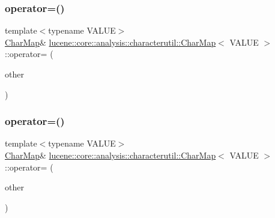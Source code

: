 \mbox{\label{classlucene_1_1core_1_1analysis_1_1characterutil_1_1CharMap_aabcf4f0d534fb6050aeb140d418a0fba}} 
\subsubsection{\texorpdfstring{operator=()}{operator=()}\hspace{0.1cm}{\footnotesize\ttfamily [1/2]}}
{\footnotesize\ttfamily template$<$typename V\+A\+L\+UE$>$ \\
\mbox{\hyperlink{classlucene_1_1core_1_1analysis_1_1characterutil_1_1CharMap}{Char\+Map}}\& \mbox{\hyperlink{classlucene_1_1core_1_1analysis_1_1characterutil_1_1CharMap}{lucene\+::core\+::analysis\+::characterutil\+::\+Char\+Map}}$<$ V\+A\+L\+UE $>$\+::operator= (\begin{DoxyParamCaption}\item[{const \mbox{\hyperlink{classlucene_1_1core_1_1analysis_1_1characterutil_1_1CharMap}{Char\+Map}}$<$ V\+A\+L\+UE $>$ \&}]{other }\end{DoxyParamCaption})\hspace{0.3cm}{\ttfamily [inline]}}

\mbox{\label{classlucene_1_1core_1_1analysis_1_1characterutil_1_1CharMap_adef93a87f617af2b3f949b40ffd82cca}} 
\subsubsection{\texorpdfstring{operator=()}{operator=()}\hspace{0.1cm}{\footnotesize\ttfamily [2/2]}}
{\footnotesize\ttfamily template$<$typename V\+A\+L\+UE$>$ \\
\mbox{\hyperlink{classlucene_1_1core_1_1analysis_1_1characterutil_1_1CharMap}{Char\+Map}}\& \mbox{\hyperlink{classlucene_1_1core_1_1analysis_1_1characterutil_1_1CharMap}{lucene\+::core\+::analysis\+::characterutil\+::\+Char\+Map}}$<$ V\+A\+L\+UE $>$\+::operator= (\begin{DoxyParamCaption}\item[{const \mbox{\hyperlink{classlucene_1_1core_1_1analysis_1_1characterutil_1_1CharMap}{Char\+Map}}$<$ V\+A\+L\+UE $>$ \&\&}]{other }\end{DoxyParamCaption})\hspace{0.3cm}{\ttfamily [inline]}}

